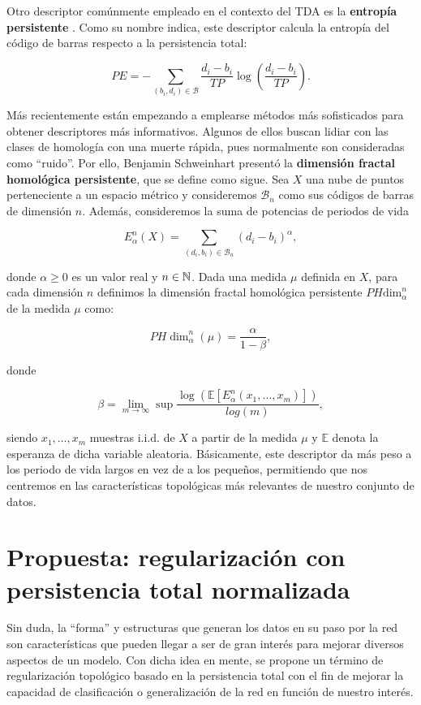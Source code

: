 Otro descriptor comúnmente empleado en el contexto del TDA es la \textbf{entropía
	persistente} \cite{rucco2016characterisation}. Como su nombre indica, este descriptor
calcula la entropía del código de barras respecto a la persistencia total:

\[
PE = - \sum_{(b_i, d_i)\in \mathcal{B}}\frac{d_{i} - b_{i}}{TP}\log\left(\frac{d_{i}
	- b_{i}}{TP}\right).
\]

Más recientemente están empezando a emplearse métodos más sofisticados para
obtener descriptores más informativos. Algunos de ellos buscan lidiar con las clases
de homología con una muerte rápida, pues normalmente son consideradas como
\enquote{ruido}. Por ello, Benjamin Schweinhart \cite{schweinhart2020fractaldimensionpersistenthomology}
presentó la \textbf{dimensión fractal homológica persistente}, que se define como
sigue. Sea $X$ una nube de puntos perteneciente a un espacio métrico y
consideremos $\mathcal{B}_{n}$ como sus códigos de barras de dimensión $n$. Además,
consideremos la suma de potencias de periodos de vida

\[
E_{\alpha}^{n}(X) = \sum_{(d_i, b_i) \in \mathcal{B}_n}(d_{i} - b_{i})^{\alpha}
,
\]

donde $\alpha \geq 0$ es un valor real y $n \in \mathbb{N}$. Dada una medida $\mu$ definida
en $X$, para cada dimensión $n$ definimos la dimensión fractal homológica
persistente $PH\text{dim}_{\alpha}^{n}$ de la medida $\mu$ como:

\[
PH\dim_{\alpha}^{n}(\mu) = \frac{\alpha}{1 - \beta},
\]

donde

\[
\beta = \lim_{m \to \infty}\sup \frac{\log\left(\mathbb{E}\left[ E_{\alpha}^{n}(x_{1},
	\dots, x_{m})\right]\right)}{log(m)},
\]

siendo $x_{1}, \dots, x_{m}$ muestras $\text{i.i.d.}$ de $X$ a partir de la medida
$\mu$ y $\mathbb{E}$ denota la esperanza de dicha variable aleatoria.
Básicamente, este descriptor da más peso a los periodo de vida largos en vez de a
los pequeños, permitiendo que nos centremos en las características topológicas
más relevantes de nuestro conjunto de datos.

\section{Propuesta: regularización con persistencia total normalizada}
\label{subsec:regularizer}

Sin duda, la \enquote{forma} y estructuras que generan los datos en su paso por la
red son características que pueden llegar a ser de gran interés para mejorar diversos
aspectos de un modelo. Con dicha idea en mente, se propone un término de regularización
topológico basado en la persistencia total con el fin de mejorar la capacidad de
clasificación o generalización de la red en función de nuestro interés.

